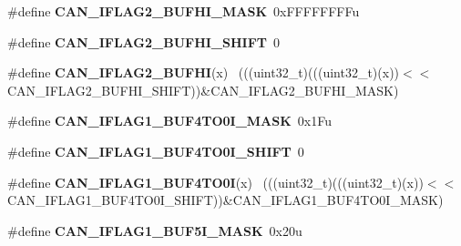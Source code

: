 \begin{DoxyCompactItemize}
\item 
\hypertarget{group___c_a_n___register___masks_ga20dcde29d52484685d8b0c2bb9ba2ad7}{}\#define {\bfseries C\+A\+N\+\_\+\+I\+F\+L\+A\+G2\+\_\+\+B\+U\+F\+H\+I\+\_\+\+M\+A\+S\+K}~0x\+F\+F\+F\+F\+F\+F\+F\+Fu\label{group___c_a_n___register___masks_ga20dcde29d52484685d8b0c2bb9ba2ad7}

\item 
\hypertarget{group___c_a_n___register___masks_gaf26eb008c22bfc3871ef7cb6d87c7774}{}\#define {\bfseries C\+A\+N\+\_\+\+I\+F\+L\+A\+G2\+\_\+\+B\+U\+F\+H\+I\+\_\+\+S\+H\+I\+F\+T}~0\label{group___c_a_n___register___masks_gaf26eb008c22bfc3871ef7cb6d87c7774}

\item 
\hypertarget{group___c_a_n___register___masks_ga0f3fdf56f15e5cc9a4bf7c37a4ca8fff}{}\#define {\bfseries C\+A\+N\+\_\+\+I\+F\+L\+A\+G2\+\_\+\+B\+U\+F\+H\+I}(x)                                        ~(((uint32\+\_\+t)(((uint32\+\_\+t)(x))$<$$<$C\+A\+N\+\_\+\+I\+F\+L\+A\+G2\+\_\+\+B\+U\+F\+H\+I\+\_\+\+S\+H\+I\+F\+T))\&C\+A\+N\+\_\+\+I\+F\+L\+A\+G2\+\_\+\+B\+U\+F\+H\+I\+\_\+\+M\+A\+S\+K)\label{group___c_a_n___register___masks_ga0f3fdf56f15e5cc9a4bf7c37a4ca8fff}

\item 
\hypertarget{group___c_a_n___register___masks_ga7cae7a414b6cbda0bfd1750a793ef044}{}\#define {\bfseries C\+A\+N\+\_\+\+I\+F\+L\+A\+G1\+\_\+\+B\+U\+F4\+T\+O0\+I\+\_\+\+M\+A\+S\+K}~0x1\+Fu\label{group___c_a_n___register___masks_ga7cae7a414b6cbda0bfd1750a793ef044}

\item 
\hypertarget{group___c_a_n___register___masks_gac55369b6f357dd331ed5c9557eeddb40}{}\#define {\bfseries C\+A\+N\+\_\+\+I\+F\+L\+A\+G1\+\_\+\+B\+U\+F4\+T\+O0\+I\+\_\+\+S\+H\+I\+F\+T}~0\label{group___c_a_n___register___masks_gac55369b6f357dd331ed5c9557eeddb40}

\item 
\hypertarget{group___c_a_n___register___masks_ga381897dc01d35c267b9203dc1e3a2de3}{}\#define {\bfseries C\+A\+N\+\_\+\+I\+F\+L\+A\+G1\+\_\+\+B\+U\+F4\+T\+O0\+I}(x)                                  ~(((uint32\+\_\+t)(((uint32\+\_\+t)(x))$<$$<$C\+A\+N\+\_\+\+I\+F\+L\+A\+G1\+\_\+\+B\+U\+F4\+T\+O0\+I\+\_\+\+S\+H\+I\+F\+T))\&C\+A\+N\+\_\+\+I\+F\+L\+A\+G1\+\_\+\+B\+U\+F4\+T\+O0\+I\+\_\+\+M\+A\+S\+K)\label{group___c_a_n___register___masks_ga381897dc01d35c267b9203dc1e3a2de3}

\item 
\hypertarget{group___c_a_n___register___masks_ga5ba2a22d90a915a0504e74e0be2ae46e}{}\#define {\bfseries C\+A\+N\+\_\+\+I\+F\+L\+A\+G1\+\_\+\+B\+U\+F5\+I\+\_\+\+M\+A\+S\+K}~0x20u\label{group___c_a_n___register___masks_ga5ba2a22d90a915a0504e74e0be2ae46e}


\end{DoxyCompactItemize}
